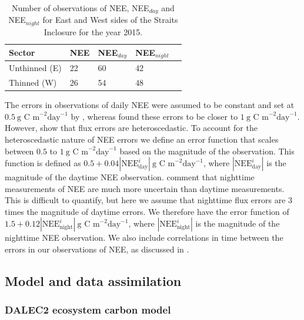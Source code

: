\begin{table}[ht] 
	\caption{Number of observations of NEE, NEE\(_{day}\) and NEE\(_{night}\) for East and West sides of the Straits Inclosure for the year 2015.}
\begin{center}
	\begin{tabular}{| l | l | l | l | l |}
	\hline
	Sector & NEE & NEE\(_{day}\) & NEE\(_{night}\)  \\ \hline
	Unthinned (E) & 22 & 60 & 42 \\ \hline
	Thinned (W) & 26 & 54 & 48 \\ \hline
	\end{tabular}
	\label{table:nee_obs}
\end{center} 
\end{table}

The errors in observations of daily NEE were assumed to be constant and set at $0.5~\text{g C m}^{-2} \text{day}^{-1}$ by \citet{williams2005improved}, whereas \citet{braswell2005estimating} found these errors to be closer to $1~\text{g C m}^{-2} \text{day}^{-1}$. However, \citet{Richardson200838} show that flux errors are heteroscedastic. To account for the heteroscedastic nature of NEE errors we define an error function that scales between $0.5$ to $1~\text{g C m}^{-2} \text{day}^{-1}$ based on the magnitude of the observation. This function is defined as $0.5 + 0.04|\text{NEE}_{\text{day}}^{i}|~\text{g C m}^{-2} \text{day}^{-1}$, where \(|\text{NEE}_{\text{day}}^{i}|\) is the magnitude of the daytime NEE observation. \citet{raupach2005model} comment that nighttime measurements of NEE are much more uncertain than daytime measurements. This is difficult to quantify, but here we assume that nighttime flux errors are 3 times the magnitude of daytime errors. We therefore have the error function of $1.5 + 0.12|\text{NEE}_{\text{night}}^{i}|~\text{g C m}^{-2} \text{day}^{-1}$, where \(|\text{NEE}_{\text{night}}^{i}|\) is the magnitude of the nighttime NEE observation. We also include correlations in time between the errors in our observations of NEE, as discussed in \citet{Pinnington2016299}.

\subsection{Model and data assimilation}
\subsubsection{DALEC2 ecosystem carbon model} \label{sec:dalec2}

